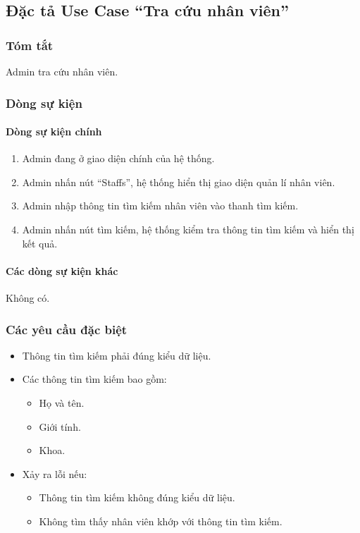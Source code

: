 \subsection{Đặc tả Use Case ``Tra cứu nhân viên''}

\subsubsection{Tóm tắt}
Admin tra cứu nhân viên.

\subsubsection{Dòng sự kiện}
\paragraph{\textbf{Dòng sự kiện chính}}
\begin{enumerate}
  \item Admin đang ở giao diện chính của hệ thống.
  \item Admin nhấn nút ``Staffs'', hệ thống hiển thị giao diện quản lí nhân viên.
  \item Admin nhập thông tin tìm kiếm nhân viên vào thanh tìm kiếm.
  \item Admin nhấn nút tìm kiếm, hệ thống kiểm tra thông tin tìm kiếm và hiển thị kết quả.
\end{enumerate}

\paragraph{\textbf{Các dòng sự kiện khác}}
Không có.

\subsubsection{Các yêu cầu đặc biệt}
\begin{itemize}
  \item Thông tin tìm kiếm phải đúng kiểu dữ liệu.
  \item Các thông tin tìm kiếm bao gồm:
    \begin{itemize}
      \item Họ và tên.
      \item Giới tính.
      \item Khoa.
    \end{itemize}
  \item Xảy ra lỗi nếu:
    \begin{itemize}
      \item Thông tin tìm kiếm không đúng kiểu dữ liệu.
      \item Không tìm thấy nhân viên khớp với thông tin tìm kiếm.
    \end{itemize}
\end{itemize}

